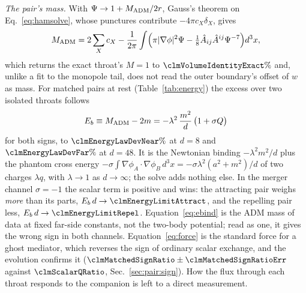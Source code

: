 \documentclass[twocolumn,floatfix,aps,prd,superscriptaddress,nofootinbib]{revtex4-2}
\begin{document}
\emph{The pair's mass.} With $\Psi\to1+M_{\rm ADM}/2r$, Gauss's theorem on Eq.~\eqref{eq:hamsolve}, whose punctures contribute $-4\pi c_X\delta_X$, gives
\begin{equation}
M_{\rm ADM}=2\sum_X c_X-\frac1{2\pi}\int\Bigl(\pi|\nabla\phi|^2\Psi-\tfrac18\hat A_{ij}\hat A^{ij}\Psi^{-7}\Bigr)d^3x ,
\label{eq:madmvol}
\end{equation}
which returns the exact throat's $M=1$ to $\clmVolumeIdentityExact\%$ and, unlike a fit to the monopole tail, does not read the outer boundary's offset of $w$ as mass. For matched pairs at rest (Table~\ref{tab:energy}) the excess over two isolated throats follows
\begin{equation}
E_b\equiv M_{\rm ADM}-2m=-\lambda^2\,\frac{m^2}{d}\,\bigl(1+\sigma Q\bigr)
\label{eq:ebind}
\end{equation}
for both signs, to $\clmEnergyLawDevNear\%$ at $d=8$ and $\clmEnergyLawDevFar\%$ at $d=48$. It is the Newtonian binding $-\lambda^2m^2/d$ plus the phantom cross energy $-\sigma\!\int\nabla\phi_A\!\cdot\!\nabla\phi_B\,d^3x=-\sigma\lambda^2(a^2+m^2)/d$ of two charges $\lambda q$, with $\lambda\to1$ as $d\to\infty$; the solve adds nothing else. In the merger channel $\sigma=-1$ the scalar term is positive and wins: the attracting pair weighs \emph{more} than its parts, $E_b\,d\to\clmEnergyLimitAttract$, and the repelling pair less, $E_b\,d\to\clmEnergyLimitRepel$. Equation~\eqref{eq:ebind} is the ADM mass of data at fixed far-side constants, not the two-body potential; read as one, it gives the wrong sign in both channels. Equation~\eqref{eq:force} is the standard force for a ghost mediator, which reverses the sign of ordinary scalar exchange, and the evolution confirms it ($\clmMatchedSignRatio\pm\clmMatchedSignRatioErr$ against $\clmScalarQRatio$, Sec.~\ref{sec:pair:sign}). How the flux through each throat responds to the companion is left to a direct measurement.
\end{document}
